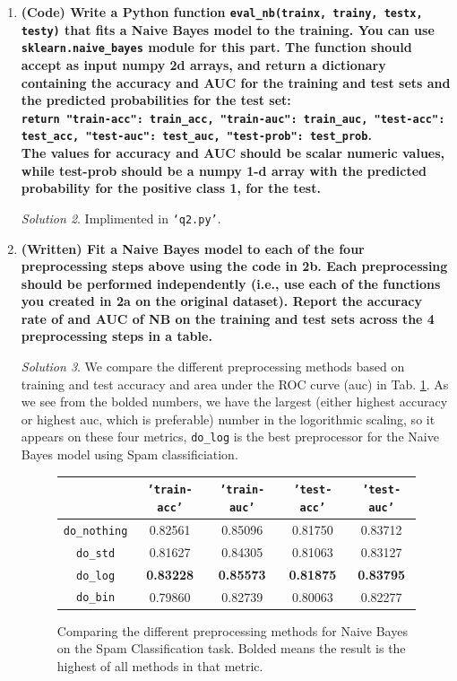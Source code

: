 \documentclass[a4paper,12pt]{article}
\theoremstyle{definition}
\theoremstyle{remark}
\newtheorem*{solution}{Solution}
\begin{document}
\begin{enumerate}
\begin{enumerate}
			\begin{solution}
				Implimented in \texttt{`q2.py'}.
			\end{solution}
			\item {\bf  (Code) Write a Python function \texttt{eval\_nb(trainx, trainy, testx, testy)} that fits a Naive Bayes model to the training. You can use \texttt{sklearn.naive\_bayes} module for this part. The function should accept as input numpy 2d arrays, and return a dictionary containing the accuracy and AUC for the training and test sets and the predicted probabilities for the test set: \\
				\texttt{return {"train-acc":
					train\_acc, "train-auc": train\_auc, "test-acc": test\_acc, "test-auc":
					test\_auc, "test-prob": test\_prob}}. \\
				The values for accuracy and AUC should be scalar
				numeric values, while test-prob should be a numpy 1-d array with the predicted probability for the positive class 1, for the test.}
			\begin{solution}
					Implimented in \texttt{`q2.py'}.
			\end{solution}
			\item {\bf (Written) Fit a Naive Bayes model to each of the four preprocessing steps above using the code in 2b. Each preprocessing should be performed independently (i.e., use each of the functions you created in 2a on the original dataset). Report the accuracy rate of and AUC of NB on the training and test sets across the 4 preprocessing steps in a table.}	
			\begin{solution}
				We compare the different preprocessing methods based on training and test accuracy and area under the ROC curve (auc) in Tab.  \ref{tab:nbresults}. As we see from the bolded numbers, we have the largest (either highest accuracy or highest auc, which is preferable) number in the logorithmic scaling, so it appears on these four metrics, \texttt{do\_log} is the best preprocessor for the Naive Bayes model using Spam classificiation.
				\begin{figure}[h]
					\centering
					\begin{tabular}{|c|cccc|}
						\hline
						&  \texttt{'train-acc'}&\texttt{'train-auc'}  & \texttt{'test-acc'} &  \texttt{'test-auc'}\\
						\hline\hline
						\texttt{do\_nothing}&  0.82561&  0.85096&0.81750  &0.83712  \\
						\texttt{do\_std}&  0.81627& 0.84305 & 0.81063 &0.83127  \\
						\texttt{do\_log}&{\bf0.83228}  & {\bf0.85573} & {\bf0.81875} & {\bf0.83795} \\
						\texttt{do\_bin}& 0.79860&0.82739  & 0.80063 &  0.82277\\
						\hline
					\end{tabular}
					\caption{Comparing the different preprocessing methods for Naive Bayes on the Spam Classification task. Bolded means the result is the highest of all methods in that metric.}
					\label{tab:nbresults}
				\end{figure}
				

\end{solution}
\end{enumerate}
\end{enumerate}
\end{document}
